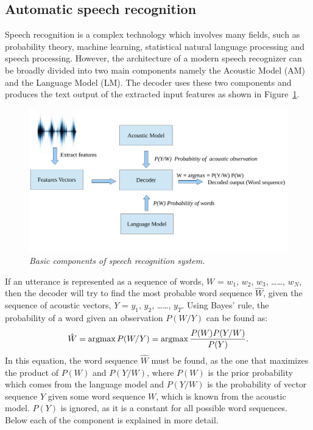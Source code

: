 \documentclass[a4paper, 12pt]{article}
\newcommand{\argmax}{\operatornamewithlimits{argmax}}
\begin{document}
\subsection{Automatic speech recognition}
Speech recognition is a complex technology which involves many fields, such as probability theory, machine learning, statistical natural language processing and speech processing. However, the architecture of a modern speech recognizer can be broadly divided into two main components namely the Acoustic Model (AM) and the Language Model (LM). The decoder uses these two components and produces the text output of the extracted input features as shown in Figure~\ref{fig:asr_component1}.
\begin{figure}[ht]
\centering
\includegraphics[width=\textwidth]{ASR_Component1.pdf}
\vspace{-1.2cm}
\caption{\textit{Basic components of speech recognition system.}}
\label{fig:asr_component1}
\end{figure}


If an utterance is represented as a sequence of words, $W$ = $w_1$, $w_2$, $w_3$, \dots \dots, $w_N$, then the decoder will try to find the most probable word sequence $\hat{W}$, given the sequence of acoustic vectors, $Y$ = $y_1$, $y_2$, \dots \dots, $y_T$. Using Bayes' rule, the probability of a word given an observation $P(W/Y)$ can be found as:
\begin{equation}
\label{equ:bayes_rule}
\hat{W} = \argmax P(W/Y) = \argmax\frac{P(W)P(Y/W)}{P(Y)}.
\end{equation}
In this equation, the word sequence $\hat{W}$ must be found, as the one that maximizes the product of $P(W)$ and $P(Y/W)$, where $P(W)$ is the prior probability which comes from the language model and $P(Y/W)$ is the probability of vector sequence $Y$ given some word sequence $W$, which is known from the acoustic model. $P(Y)$ is ignored, as it is a constant for all possible word sequences. Below each of the component is explained in more detail.
\end{document}
